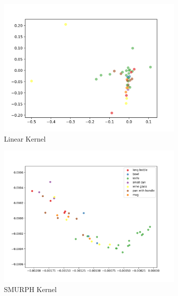 \documentclass[10pt]{article}
\begin{document}
\begin{figure}[H]
    \centering
    \begin{subfigure}[h]{0.33\textwidth}
        \includegraphics[width=\linewidth]{DB_linear}
        \caption{Linear Kernel}
    \end{subfigure}
    \begin{subfigure}[h]{0.33\textwidth}
        \includegraphics[width=\linewidth]{DB_smurf}
        \caption{SMURPH Kernel}
    \end{subfigure}%
    \begin{subfigure}[h]{0.33\textwidth}

\end{subfigure}
\end{figure}
\end{document}
